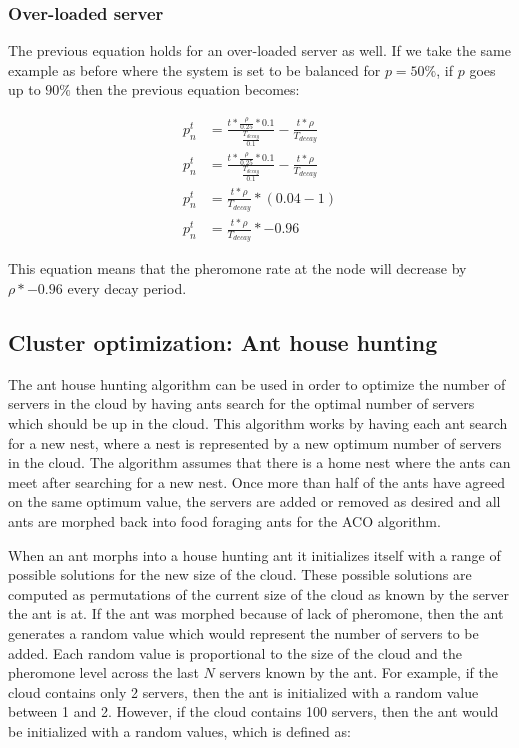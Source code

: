 \subsubsection{Over-loaded server}

The previous equation holds for an over-loaded server as well. If we take the same example as before where the system is set to be balanced for $p = 50\%$, if $p$ goes up to $90\%$ then the previous equation becomes:

\begin{equation}
\begin{aligned}
p^{t}_{n} &= \frac{t *  \frac{\rho}{0.25} * 0.1}{\frac{T_{decay}}{0.1}} - \frac{t *  \rho}{T_{decay}} \\
p^{t}_{n} &= \frac{t *  \frac{\rho}{0.25} * 0.1}{\frac{T_{decay}}{0.1}} - \frac{t *  \rho}{T_{decay}} \\
p^{t}_{n} &= \frac{t * \rho}{T_{decay}} * (0.04 - 1) \\
p^{t}_{n} &= \frac{t * \rho}{T_{decay}} * -0.96
\end{aligned}
\end{equation}

This equation means that the pheromone rate at the node will decrease by $\rho * -0.96$ every decay period.

\subsection{Cluster optimization: Ant house hunting}

The ant house hunting algorithm can be used in order to optimize the number of servers in the cloud by having ants search for the optimal number of servers which should be up in the cloud. This algorithm works by having each ant search for a new nest, where a nest is represented by a new optimum number of servers in the cloud. The algorithm assumes that there is a home nest where the ants can meet after searching for a new nest. Once more than half of the ants have agreed on the same optimum value, the servers are added or removed as desired and all ants are morphed back into food foraging ants for the ACO algorithm. \cite{selforg:antreloc}

When an ant morphs into a house hunting ant it initializes itself with a range of possible solutions for the new size of the cloud. These possible solutions are computed as permutations of the current size of the cloud as known by the server the ant is at. If the ant was morphed because of lack of pheromone, then the ant generates a random value which would represent the number of servers to be added. Each random value is proportional to the size of the cloud and the pheromone level across the last $N$ servers known by the ant. For example, if the cloud contains only 2 servers, then the ant is initialized with a random value between 1 and 2. However, if the cloud contains 100 servers, then the ant would be initialized with a random values, which is defined as:

